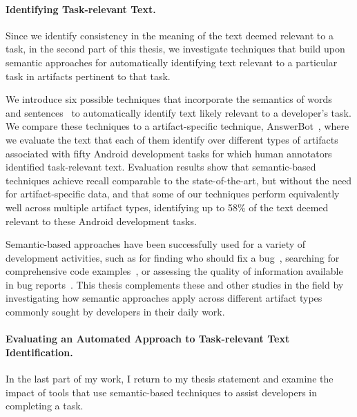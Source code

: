 \paragraph{\textbf{Identifying Task-relevant Text.}} 


Since we identify consistency in the meaning of the text deemed relevant to a task, 
in the second part of this thesis, we investigate
techniques that build upon semantic approaches 
for automatically identifying text relevant to a particular task in artifacts pertinent to that task.


We introduce six possible techniques that incorporate the semantics of words~\cite{Mikolov2013, Devlin2018Bert}
and sentences~\cite{fillmore1976frame, marques2021}
to automatically identify text likely relevant to a developer's task.
We compare these techniques to a artifact-specific technique, AnswerBot~\cite{Xu2017},
where we evaluate the text that each of them identify
 over different types of artifacts
associated with fifty Android development tasks 
for which human annotators identified task-relevant text.
Evaluation results show that semantic-based techniques
achieve recall comparable to the state-of-the-art, but without the need for artifact-specific data,
and that some of our techniques perform equivalently well across
multiple artifact types, identifying up to 58\%
of the text 
deemed relevant to these Android development tasks.


Semantic-based approaches have been successfully used for a variety of development activities, such as
for finding who should fix a bug~\cite{yang2016}, searching for comprehensive code examples~\cite{silva2019},
or assessing the quality of information available in bug reports~\cite{chaparro2019}.
This thesis complements these and other studies in the field
by investigating how semantic approaches apply across different artifact types
commonly sought by developers in their daily work.




\paragraph{\textbf{Evaluating an Automated Approach to Task-relevant Text Identification.}} 




In the last part of my work, I return to my thesis statement
and examine the impact of tools that use semantic-based techniques to assist developers in 
completing a task. 



